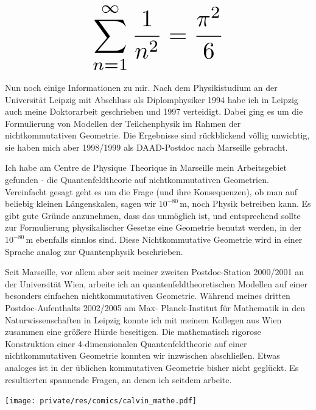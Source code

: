 \begin{multicols}{2}
\[
\resizebox{0.45\hsize}{!}{$\displaystyle\sum_{n = 1}^\infty \frac{1}{n^2} = \frac{\pi^2}{6}$}
\]

Nun noch einige Informationen zu mir. Nach dem Physikistudium an der Universität Leipzig mit Abschluss als Diplomphysiker 1994 habe ich in Leipzig auch meine Doktorarbeit geschrieben und 1997 verteidigt. Dabei ging es um die Formulierung von Modellen der Teilchenphysik im Rahmen der nichtkommutativen Geometrie. Die Ergebnisse sind rückblickend völlig unwichtig, sie haben mich aber 1998/1999 als DAAD-Postdoc nach Marseille gebracht.

Ich habe am Centre de Physique Theorique in Marseille mein Arbeitsgebiet gefunden - die Quantenfeldtheorie auf nichtkommutativen Geometrien. Vereinfacht gesagt geht es um die Frage (und ihre Konsequenzen), ob man auf beliebig kleinen Längenskalen, sagen wir $10^{-80}$\,m, noch Physik betreiben kann. Es gibt gute Gründe anzunehmen, dass das unmöglich ist, und entsprechend sollte zur Formulierung physikalischer Gesetze eine Geometrie benutzt werden, in der $10^{-80}$\,m ebenfalls sinnlos sind. Diese Nichtkommutative Geometrie wird in einer Sprache analog zur Quantenphysik beschrieben.

Seit Marseille, vor allem aber seit meiner zweiten Postdoc-Station 2000/2001 an der Universität Wien, arbeite ich an quantenfeldtheoretischen Modellen auf einer besonders einfachen nichtkommutativen Geometrie. Während meines dritten Postdoc-Aufenthalts 2002/2005 am Max- Planck-Institut für Mathematik in den Naturwissenschaften in Leipzig konnte ich mit meinem Kollegen aus Wien zusammen eine größere Hürde beseitigen. Die mathematisch rigorose Konstruktion einer 4-dimensionalen Quantenfeldtheorie auf einer nichtkommutativen Geometrie konnten wir inzwischen abschließen. Etwas analoges ist in der üblichen kommutativen Geometrie bisher nicht geglückt. Es resultierten spannende Fragen, an denen ich seitdem arbeite.

\begin{center}
\texttt{[image: private/res/comics/calvin\_mathe.pdf]}
\end{center}
\end{multicols}
